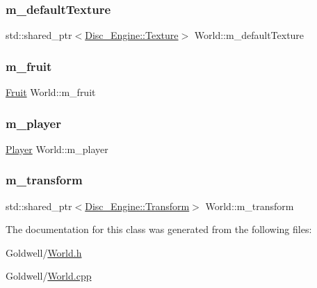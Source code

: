 \mbox{\label{class_world_ae7e5b1953918b63b9fbb2c7a2c5d82d6}} 
\subsubsection{\texorpdfstring{m\+\_\+default\+Texture}{m\_defaultTexture}}
{\footnotesize\ttfamily std\+::shared\+\_\+ptr$<$\mbox{\hyperlink{class_disc___engine_1_1_texture}{Disc\+\_\+\+Engine\+::\+Texture}}$>$ World\+::m\+\_\+default\+Texture\hspace{0.3cm}{\ttfamily [private]}}

\mbox{\label{class_world_a3558a6a064be3565ee8835a34da58d4d}} 
\subsubsection{\texorpdfstring{m\+\_\+fruit}{m\_fruit}}
{\footnotesize\ttfamily \mbox{\hyperlink{class_fruit}{Fruit}} World\+::m\+\_\+fruit\hspace{0.3cm}{\ttfamily [private]}}

\mbox{\label{class_world_ae983a13c169f3dbd4cbe0cbb0e0f6739}} 
\subsubsection{\texorpdfstring{m\+\_\+player}{m\_player}}
{\footnotesize\ttfamily \mbox{\hyperlink{class_player}{Player}} World\+::m\+\_\+player\hspace{0.3cm}{\ttfamily [private]}}

\mbox{\label{class_world_a13c7bbabeb92dae015b76b582bac8084}} 
\subsubsection{\texorpdfstring{m\+\_\+transform}{m\_transform}}
{\footnotesize\ttfamily std\+::shared\+\_\+ptr$<$\mbox{\hyperlink{class_disc___engine_1_1_transform}{Disc\+\_\+\+Engine\+::\+Transform}}$>$ World\+::m\+\_\+transform\hspace{0.3cm}{\ttfamily [private]}}



The documentation for this class was generated from the following files\+:\begin{DoxyCompactItemize}
\item 
Goldwell/\mbox{\hyperlink{_world_8h}{World.\+h}}\item 
Goldwell/\mbox{\hyperlink{_world_8cpp}{World.\+cpp}}\end{DoxyCompactItemize}
